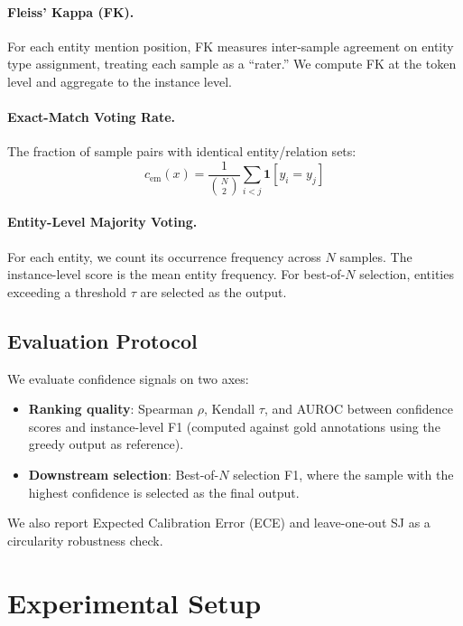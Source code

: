 \documentclass[11pt,a4paper]{article}
\begin{document}
\paragraph{Fleiss' Kappa (FK).}
For each entity mention position, FK measures inter-sample agreement on entity type assignment, treating each sample as a ``rater.'' We compute FK at the token level and aggregate to the instance level.

\paragraph{Exact-Match Voting Rate.}
The fraction of sample pairs with identical entity/relation sets:
\begin{equation}
    c_{\text{em}}(x) = \frac{1}{\binom{N}{2}} \sum_{i<j} \mathbf{1}[y_i = y_j]
\end{equation}

\paragraph{Entity-Level Majority Voting.}
For each entity, we count its occurrence frequency across $N$ samples. The instance-level score is the mean entity frequency. For best-of-$N$ selection, entities exceeding a threshold $\tau$ are selected as the output.

\subsection{Evaluation Protocol}

We evaluate confidence signals on two axes:
\begin{itemize}
    \item \textbf{Ranking quality}: Spearman $\rho$, Kendall $\tau$, and AUROC between confidence scores and instance-level F1 (computed against gold annotations using the greedy output as reference).
    \item \textbf{Downstream selection}: Best-of-$N$ selection F1, where the sample with the highest confidence is selected as the final output.
\end{itemize}
We also report Expected Calibration Error (ECE) and leave-one-out SJ as a circularity robustness check.


\section{Experimental Setup}
\end{document}
